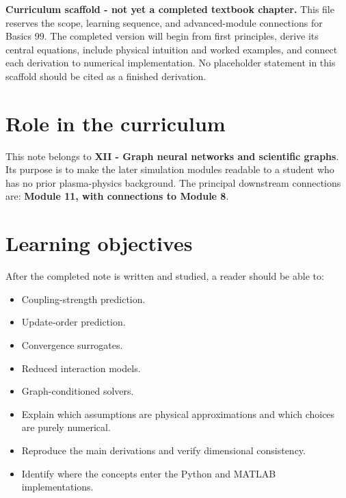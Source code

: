 \documentclass[11pt]{article}
\begin{document}

\begin{overviewbox}
\textbf{Curriculum scaffold - not yet a completed textbook chapter.} This file reserves the scope, learning sequence, and advanced-module connections for Basics 99. The completed version will begin from first principles, derive its central equations, include physical intuition and worked examples, and connect each derivation to numerical implementation. No placeholder statement in this scaffold should be cited as a finished derivation.
\end{overviewbox}

\ProjectTOC

\section{Role in the curriculum}
This note belongs to \textbf{XII - Graph neural networks and scientific graphs}. Its purpose is to make the later simulation modules readable to a student who has no prior plasma-physics background. The principal downstream connections are: \textbf{Module 11, with connections to Module 8}.

\section{Learning objectives}
After the completed note is written and studied, a reader should be able to:
\begin{itemize}[leftmargin=1.6em]
\item Coupling-strength prediction.
\item Update-order prediction.
\item Convergence surrogates.
\item Reduced interaction models.
\item Graph-conditioned solvers.
\item Explain which assumptions are physical approximations and which choices are purely numerical.
\item Reproduce the main derivations and verify dimensional consistency.
\item Identify where the concepts enter the Python and MATLAB implementations.
\end{itemize}
\end{document}
